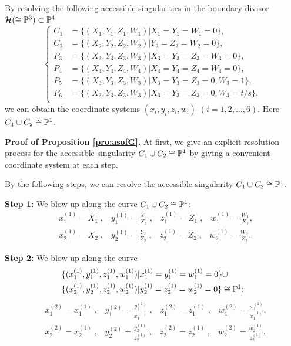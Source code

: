 \begin{prop}\label{pro:asofG}
By resolving the following accessible singularities in the boundary divisor ${\mathcal H} (\cong {\Bbb P}^3) \subset {\Bbb P}^4$
\begin{equation*}
  \left\{
  \begin{aligned}
   C_1 &=\{(X_1,Y_1,Z_1,W_1)|X_1=Y_1=W_1=0 \},\\
   C_2 &=\{(X_2,Y_2,Z_2,W_2)|Y_2=Z_2=W_2=0 \},\\
   P_3 &=\{(X_3,Y_3,Z_3,W_3)|X_3=Y_3=Z_3=W_3=0\},\\
   P_4 &=\{(X_4,Y_4,Z_4,W_4)|X_4=Y_4=Z_4=W_4=0\},\\
   P_5 &=\{(X_3,Y_3,Z_3,W_3)|X_3=Y_3=Z_3=0,W_3=1\},\\
   P_6 &=\{(X_3,Y_3,Z_3,W_3)|X_3=Y_3=Z_3=0,W_3=t/s\},\\
   \end{aligned}
  \right. 
\end{equation*}
we can obtain the coordinate systems $(x_i,y_i,z_i,w_i)$ $(i=1,2,\dots,6)$. Here $C_1 \cup C_2 \cong {\Bbb P}^1$.
\end{prop}

\noindent
{\bf Proof of Proposition \ref{pro:asofG}.}
At first, we give an explicit resolution process for the accessible singularity $C_1 \cup C_2 \cong {\Bbb P}^1$ by giving a convenient coordinate system at each step.

By the following steps, we can resolve the accessible singularity $C_1 \cup C_2 \cong {\Bbb P}^1$.

{\bf Step 1:} We blow up along the curve $C_1 \cup C_2 \cong {\Bbb P}^1${\rm : \rm}
\begin{align*}
&{x_{1}^{(1)}}=X_1 \;, \;\;\; {y_{1}^{(1)}}=\frac{Y_1}{X_1} \;, \;\;\; {z_{1}^{(1)}}=Z_1 \;, \;\;\; {w_{1}^{(1)}}=\frac{W_1}{X_1},\\
&{x_{2}^{(1)}}=X_2 \;, \;\;\; {y_{2}^{(1)}}=\frac{Y_2}{Z_2} \;, \;\;\; {z_{2}^{(1)}}=Z_2 \;, \;\;\; {w_{2}^{(1)}}=\frac{W_2}{Z_2}.
\end{align*}


{\bf Step 2:} We blow up along the curve
\begin{align*}
&\{(x_{1}^{(1)},y_{1}^{(1)},z_{1}^{(1)},w_{1}^{(1)})|x_{1}^{(1)}=y_{1}^{(1)}=w_{1}^{(1)}=0\} \cup\\
&\{(x_{2}^{(1)},y_{2}^{(1)},z_{2}^{(1)},w_{2}^{(1)})|y_{2}^{(1)}=z_{2}^{(1)}=w_{2}^{(1)}=0\} \cong {\Bbb P}^1{\rm : \rm}
\end{align*}
\begin{align*}
&{x_{1}^{(2)}}=x_{1}^{(1)} \;, \;\;\; {y_{1}^{(2)}}=\frac{y_{1}^{(1)}}{x_{1}^{(1)}} \;, \;\;\; {z_{1}^{(2)}}=z_{1}^{(1)} \;, \;\;\; {w_{1}^{(2)}}=\frac{w_{1}^{(1)}}{x_{1}^{(1)}},\\
&{x_{2}^{(2)}}=x_{2}^{(1)} \;, \;\;\; {y_{2}^{(2)}}=\frac{y_{2}^{(1)}}{z_{2}^{(1)}} \;, \;\;\; {z_{2}^{(2)}}=z_{2}^{(1)} \;, \;\;\; {w_{2}^{(2)}}=\frac{w_{2}^{(1)}}{z_{2}^{(1)}}.
\end{align*}

